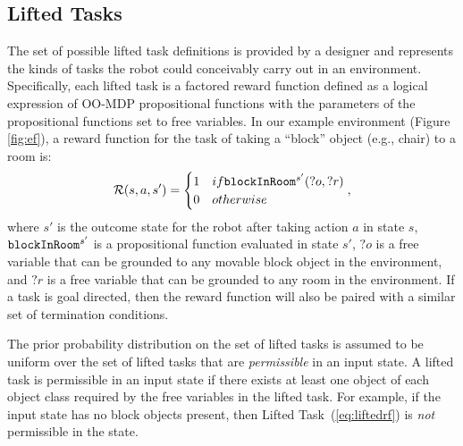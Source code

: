 \documentclass[conference]{IEEEtran}
\begin{document}
\subsection{Lifted Tasks}
The set of possible lifted task definitions is provided by a designer and represents the kinds of tasks the robot could conceivably carry out in an environment. Specifically, each lifted task is a factored reward function defined as a logical expression of OO-MDP propositional functions with the parameters of the propositional functions set to free variables. In our example environment (Figure \ref{fig:ef}), a reward function for the task of taking a ``block'' object (e.g., chair) to a room is:
\begin{equation}
\label{eq:liftedrf}
{\cal R}(s, a, s') = \begin{cases}
1 & \mbox{if } {\tt blockInRoom}^{s'}(?o, ?r) \\
0 & \mbox{otherwise}
\end{cases},
\end{equation}
where $s'$ is the outcome state for the robot after taking action $a$ in state $s$, ${\tt blockInRoom}^{s'}$ is a propositional function evaluated in state $s'$, $?o$ is a free variable that can be grounded to any movable block object in the environment, and $?r$ is a free variable that can be grounded to any room in the environment. 
If a task is goal directed, then the reward function will also be paired with a similar set of termination conditions.

The prior probability distribution on the set of lifted tasks is assumed to be uniform over the set of lifted tasks that are {\em permissible} in an input state. A lifted task is permissible in an input state if there exists at least one object of each object class required by the free variables in the lifted task. For example, if the input state has no block objects present, then Lifted Task~(\ref{eq:liftedrf}) is {\em not} permissible in the state. 
\end{document}
